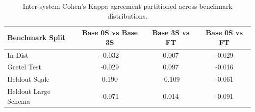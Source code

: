 \begin{table}[t]
\centering\small
\begin{tabular}{lccc}
\toprule
\textbf{Benchmark Split} & \textbf{Base 0S vs Base 3S} & \textbf{Base 3S vs FT} & \textbf{Base 0S vs FT} \\
\midrule
In Dist & -0.032 & 0.007 & -0.029 \\
Gretel Test & -0.029 & 0.097 & -0.016 \\
Heldout Sqale & 0.190 & -0.109 & -0.061 \\
Heldout Large Schema & -0.071 & 0.014 & -0.091 \\
\bottomrule
\end{tabular}
\caption{Inter-system Cohen's Kappa agreement partitioned across benchmark distributions.}
\label{tab:persplit_kappa}
\end{table}

